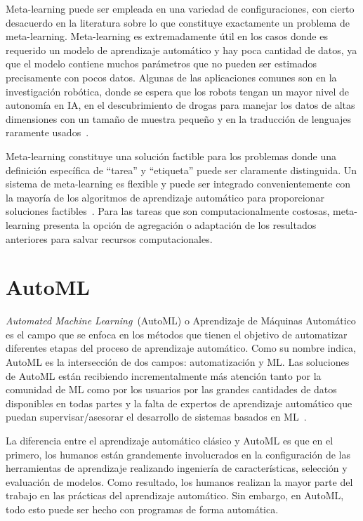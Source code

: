 Meta-learning puede ser empleada en una variedad de configuraciones, con cierto
desacuerdo en la literatura sobre lo que constituye exactamente un problema de
meta-learning. Meta-learning es extremadamente útil en los casos donde es
requerido un modelo de aprendizaje automático y hay poca cantidad de datos,
ya que el modelo contiene muchos parámetros que no pueden ser estimados
precisamente con pocos datos. Algunas de las aplicaciones comunes son en la
investigación robótica, donde se espera que los robots tengan un mayor nivel
de autonomía en IA, en el descubrimiento de drogas para manejar los datos de 
altas dimensiones con un tamaño de muestra pequeño y en la traducción de
lenguajes raramente usados~.

Meta-learning constituye una solución factible para los problemas donde una
definición específica de ``tarea'' y ``etiqueta'' puede ser claramente
distinguida. Un sistema de meta-learning es flexible y puede ser
integrado convenientemente con la mayoría de los algoritmos de aprendizaje
automático para proporcionar soluciones factibles~.
Para las tareas que son computacionalmente costosas, meta-learning presenta la
opción de agregación o adaptación de los resultados anteriores para salvar
recursos computacionales.

\section{AutoML}\label{section:AutoML}

\textit{Automated Machine Learning}~(AutoML) o Aprendizaje de Máquinas
Automático es el campo que se enfoca en los métodos que tienen el objetivo de
automatizar diferentes etapas del proceso de aprendizaje automático. Como su
nombre indica, AutoML es la intersección de dos campos: automatización y ML.
Las soluciones de AutoML están recibiendo incrementalmente más atención tanto
por la comunidad de ML como por los usuarios por las grandes cantidades de
datos disponibles en todas partes y la falta de expertos de aprendizaje
automático que puedan supervisar/asesorar el desarrollo de sistemas basados en
ML~.

La diferencia entre el aprendizaje automático clásico y AutoML es que en el
primero, los humanos están grandemente involucrados en la configuración de las
herramientas de aprendizaje realizando ingeniería de características, selección
y evaluación de modelos. Como resultado, los humanos realizan la mayor parte
del trabajo en las prácticas del aprendizaje automático. Sin embargo, en
AutoML, todo esto puede ser hecho con programas de forma automática.

